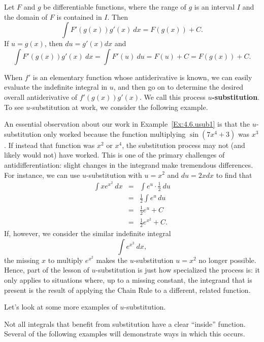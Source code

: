 {Let $F$ and $g$ be differentiable functions, where the range of $g$ is an interval $I$ and the domain of $F$ is contained in $I$. Then 
\[ \int F'(g(x))g'(x)\ dx = F(g(x)) + C. \]
If $u = g(x)$, then $du = g'(x)dx$ and 
\[ \int F'(g(x))g'(x)\ dx = \int F'(u)\ du = F(u)+C = F(g(x))+C. \]
} %

When $f'$ is an elementary function whose antiderivative is known, we can easily evaluate the indefinite integral in $u$, and then go on to determine the desired overall antiderivative of $f'(g(x)) g'(x)$.  We call this process \textbf{$u$-substitution}.  To see $u$-substitution at work, we consider the following example.


An essential observation about our work in Example~\ref{Ex:4.6.usub1} is that the $u$-substitution only worked because the function multiplying $\sin (7x^4 + 3)$ was $x^3$.  If instead that function was $x^2$ or $x^4$, the substitution process may not (and likely would not) have worked.  This is one of the primary challenges of antidifferentiation: slight changes in the integrand make tremendous differences.  For instance, we can use $u$-substitution with $u = x^2$ and $du = 2xdx$ to find that
\begin{eqnarray*}
\int xe^{x^2} \ dx & = & \int e^u \cdot \frac{1}{2} \ du \\
& = & \frac{1}{2} \int e^u \, du \\
& = & \frac{1}{2} e^u + C \\
& = & \frac{1}{2} e^{x^2} + C.
\end{eqnarray*}
If, however, we consider the similar indefinite integral
\[ \int e^{x^2} \ dx, \]
the missing $x$ to multiply $e^{x^2}$ makes the $u$-substitution $u = x^2$ no longer possible.  Hence, part of the lesson of $u$-substitution is just how specialized the process is: it only applies to situations where, up to a missing constant, the integrand that is present is the result of applying the Chain Rule to a different, related function.

Let's look at some more examples of $u$-substitution.


Not all integrals that benefit from substitution have a clear ``inside'' function. Several of the following examples will demonstrate ways in which this occurs.

